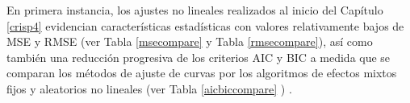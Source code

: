 \begin{table}[h]
\centering
\caption{Comparación de la raíz del error cuadrático medio (RMSE) para cada método de ajuste no lineal.}
\label{rmsecompare}
\end{table}

En primera instancia, los ajustes no lineales realizados al inicio del Capítulo \ref{crisp4} evidencian características estadísticas con valores relativamente bajos de MSE y RMSE (ver Tabla \ref{msecompare} y Tabla \ref{rmsecompare}), así como también una reducción progresiva de los criterios AIC y BIC a medida que se comparan los métodos de ajuste de curvas por los algoritmos de efectos mixtos fijos y aleatorios no lineales (ver Tabla \ref{aicbiccompare} ) .\\

